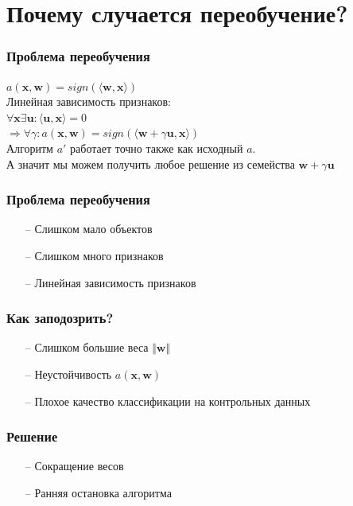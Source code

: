 \documentclass[10pt]{beamer}
\begin{document}
\section{Почему случается переобучение?}

\begin{frame}\frametitle{Проблема переобучения}
	$a(\mathbf{x}, \mathbf{w}) = sign(\langle \mathbf{w}, \mathbf{x}\rangle)$\\
	Линейная зависимость признаков:\\
	$\forall \mathbf{x} \exists \mathbf{u}: \langle \mathbf{u}, \mathbf{x}\rangle = 0$\\
	$\Rightarrow \forall \gamma: a(\mathbf{x}, \mathbf{w}) = sign(\langle \mathbf{w} + \gamma \mathbf{u}, \mathbf{x}\rangle)$\\
	\bigbreak
	Алгоритм $a'$ работает точно также как исходный $a$.\\
	А значит мы можем получить любое решение из семейства $\mathbf{w} + \gamma \mathbf{u}$
\end{frame}

\begin{frame}\frametitle{Проблема переобучения}
	\begin{itemize}
		\item[--] Слишком мало объектов
		\item[--] Слишком много признаков
		\item[--] Линейная зависимость признаков
	\end{itemize}
\end{frame}

\begin{frame}\frametitle{Как заподозрить?}
	\begin{itemize}
		\item[--] Слишком большие веса $\Vert \mathbf{w} \Vert$
		\item[--] Неустойчивость $a(\mathbf{x},\mathbf{w})$
		\item[--] Плохое качество классификации на контрольных данных
	\end{itemize}
\end{frame}

\begin{frame}\frametitle{Решение}
	\begin{itemize}
		\item[--] Сокращение весов
		\item[--] Ранняя остановка алгоритма
	\end{itemize}
\end{frame}
\end{document}
